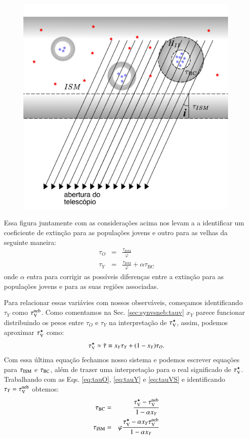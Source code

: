 \begin{figure}
	\includegraphics[width=0.99\textwidth]{figuras/Hiiregion_model.pdf}
	\caption[Modelo para extinção diferencial.]
	{}
	\label{fig:model}
\end{figure}

Essa figura juntamente com as considerações acima nos levam a a identificar um coeficiente de
extinção para as populações jovens e outro para as velhas da seguinte maneira:
\begin{eqnarray}
	\tau_O &=& \frac{\tau_{\mathrm{ISM}}}{\varphi} \\
	\label{eq:tauO}
	\tau_Y &=& \frac{\tau_{\mathrm{ISM}}}{\varphi} + \alpha\tau_{\mathrm{BC}}
	\label{eq:tauY} 
\end{eqnarray}
\noindent onde $\alpha$ entra para corrigir as possíveis diferenças entre a extinção para as
populações jovens e para as suas regiões \Hii associadas.

Para relacionar essas variávies com nossos observáveis, começamos identificando $\tau_Y$ como
$\tau_{\mathrm{V}}^{\mathrm{neb}}$. Como comentamos na Sec. \ref{sec:synvsneb:tauv} $x_Y$ parece funcionar distribuindo os
pesos entre $\tau_O$ e $\tau_Y$ na interpretação de $\tau_{\mathrm{V}}^\star$, assim, podemos aproximar $\tau_{\mathrm{V}}^\star$
como:
\begin{equation}
	\tau_{\mathrm{V}}^\star \approx \tilde{\tau} \equiv x_Y \tau_Y + (1 - x_Y) \tau_O.
	\label{eq:tauVS}
\end{equation}
Com essa última equação fechamos nosso sistema e podemos escrever equações para $\tau_{\mathrm{ISM}}$ e
$\tau_{\mathrm{BC}}$, além de trazer uma interpretação para o real significado de $\tau_{\mathrm{V}}^\star$. Trabalhando com as
Eqs. \ref{eq:tauO}, \ref{eq:tauY} e \ref{eq:tauVS} e identificando $\tau_Y = \tau_{\mathrm{V}}^{\mathrm{neb}}$ obtemos:  
\begin{eqnarray}
	\tau_{\mathrm{BC}} &=& \frac{\tau_{\mathrm{V}}^\star - \tau_{\mathrm{V}}^{\mathrm{neb}}}{1 - \alpha x_Y} \\
	\label{eq:tauBC}
	\tau_{\mathrm{ISM}} &=& \varphi\frac{\tau_{\mathrm{V}}^\star - \alpha x_Y \tau_{\mathrm{V}}^{\mathrm{neb}}}{1 - \alpha x_Y}  
	\label{eq:tauISM}
\end{eqnarray}

